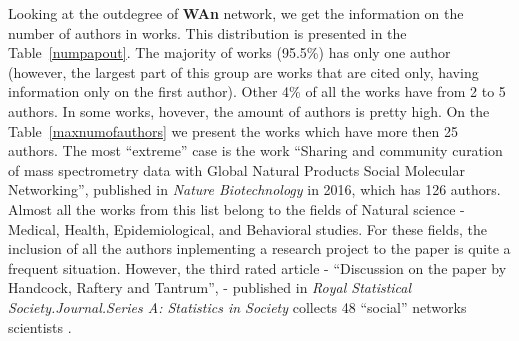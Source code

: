 \documentclass[11pt]{article} %
\newcommand{\Remark}[1]{\ifodd\value{page} \normalmarginpar
 \else \reversemarginpar \fi \marginpar{{\footnotesize #1}} }
\begin{document}
Looking at the outdegree of \textbf{WAn} network, we get the information on the number of authors in works. This distribution is presented in the Table~\ref{numpapout}. The majority of works (95.5\%) has only one author (however, the largest part of this group are works that are cited only, having information only on the first author). Other 4\% of all the works have from 2 to 5 authors. In some works, hovever, the amount of authors is pretty high. On the Table~\ref{maxnumofauthors} we present the works which have more then 25 authors. The most ``extreme'' case is the work ``Sharing and community curation of mass spectrometry data with Global Natural Products Social Molecular Networking'', published in \textit{Nature Biotechnology} in 2016, which has 126 authors. Almost all the works from this list belong to the fields of Natural science - Medical, Health, Epidemiological, and Behavioral studies. For these fields, the inclusion of all the authors inplementing a research project to the paper is quite a frequent situation.  However, the third rated article - ``Discussion on the paper by Handcock, Raftery and Tantrum'', - published in \textit{Royal Statistical Society.Journal.Series A: Statistics in Society} collects 48 ``social'' networks scientists \Remark{remove Table 6?}.\medskip
\end{document}
